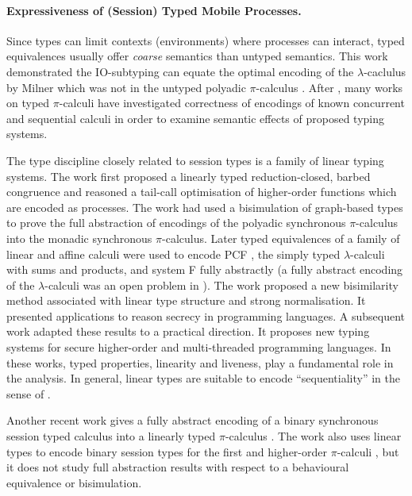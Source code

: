 \paragraph{Expressiveness of (Session) Typed Mobile Processes.}
Since types can limit
contexts (environments) where processes can interact, typed equivalences
usually offer {\em coarse} semantics than untyped semantics. 
This work demonstrated the IO-subtyping can equate 
the optimal encoding of the $\lambda$-caclulus by Milner which was not 
in the untyped polyadic $\pi$-calculus \cite{MilnerR:funp}. 
After \cite{PiSa96b}, many works on typed $\pi$-calculi 
have investigated correctness of encodings of known concurrent and
sequential calculi in order to examine semantic
effects of proposed typing systems. 

The type discipline closely related
to session types is a family of linear typing systems. The
work \cite{LinearPi} first proposed a linearly typed reduction-closed, barbed congruence and 
reasoned a tail-call optimisation of higher-order functions which are
encoded 
as processes. 
The work \cite{Yoshida96} had
used a bisimulation of graph-based types to prove the full abstraction
of encodings of the polyadic synchronous $\pi$-calculus into the
monadic synchronous $\pi$-calculus. 
Later typed equivalences of a
family of linear and affine calculi \cite{BHY,YBH04,BergerHY05} 
were used to encode 
PCF \cite{Plotkin1977223,Milner19771}, the simply typed $\lambda$-calculi with sums and products, and system F \cite{GirardJY:protyp}
fully abstractly (a fully abstract encoding of the $\lambda$-calculi 
was an open problem in \cite{MilnerR:funp}).  
The work \cite{YHB02} proposed a new bisimilarity
method associated with linear type structure and strong
normalisation. It presented applications to reason secrecy in
programming languages. A subsequent work \cite{HY02} adapted these results
to a practical direction. It proposes new typing
systems for secure higher-order and multi-threaded programming 
languages. 
In these works, typed properties, linearity and liveness, 
play a fundamental role in the analysis. In general, linear types 
are suitable to encode ``sequentiality'' in the sense of 
\cite{HylandJME:fulapi,AbramskyS:fulap}.

Another recent work \cite{DemangeonH11} gives a fully abstract encoding of a 
binary synchronous
session typed calculus into a linearly typed $\pi$-calculus \cite{BHY}.
The work \cite{Dardha:2012:STR:2370776.2370794} also 
uses linear types to 
encode binary session types for the first and higher-order 
$\pi$-calculi \cite{tlca07}, but it does not 
study full abstraction results with respect to 
a behavioural equivalence or bisimulation.


